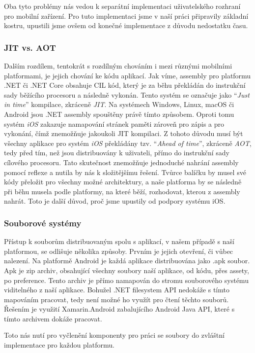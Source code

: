 Oba tyto problémy nás vedou k separátní implementaci uživatelského rozhraní pro mobilní zařízení. Pro tuto implementaci jsme v naší práci připravily základní kostru, upustili jsme ovšem od konečné implementace z důvodu nedostatku času.

\subsubsection{JIT vs. AOT}
Dalším rozdílem, tentokrát s rozdílným chováním i mezi různými mobilními platformami, je jejich chování ke kódu aplikací. Jak víme, assembly pro platformu .NET či .NET Core obsahuje CIL kód, který je za běhu překládán do instrukční sady běžícího procesoru a následně vykonán. Tento systém se označuje jako ``\emph{Just in time}'' kompilace, zkráceně \emph{JIT}. Na systémech Windows, Linux, macOS či Android jsou .NET assembly spouštěny právě tímto způsobem. Oproti tomu systém \emph{iOS} zakazuje namapování stránek paměti zároveň pro zápis a pro vykonání, čímž znemožňuje jakoukoli JIT kompilaci. Z tohoto důvodu musí být všechny aplikace pro systém \emph{iOS} překládány tzv. ``\emph{Ahead of time}'',  zkráceně \emph{AOT}, tedy před tím, než jsou distribuovány k uživateli, přímo do instrukční sady cílového procesoru.\citep{site:aot} Tato skutečnost znemožňuje jednoduché nahrání assembly pomocí reflexe a nutila by nás k složitějšímu řešení. 
Tvůrce balíčku by musel své kódy přeložit pro všechny možné architektury, a naše platforma by se následně při běhu musela podle platformy, na které běží, rozhodovat, kterou z assembly nahrát. Toto je další důvod, proč jsme upustily od podpory systému iOS.

\subsubsection{Souborové systémy}
Přístup k souborům distribuovaným spolu s aplikací, v našem případě s naší platformou, se odlišuje několika způsoby. Prvním je jejich otevření, či vůbec nalezení. Na platformě Android je každá aplikace distribuována jako .apk soubor. Apk je zip archiv, obsahující všechny soubory naší aplikace, od kódu, přes assety, po preference. Tento archiv je přímo namapován do stromu souborového systému viditelného z naší aplikace. Bohužel .NET filesystem API nedokáže s tímto mapováním pracovat, tedy není možné ho využít pro čtení těchto souborů. Řešením je využití Xamarin.Android zabalujícího Android Java API, které s tímto archivem dokáže pracovat.

Toto nás nutí pro vyčlenění komponenty pro práci se soubory do zvláštní implementace pro každou platformu. 


